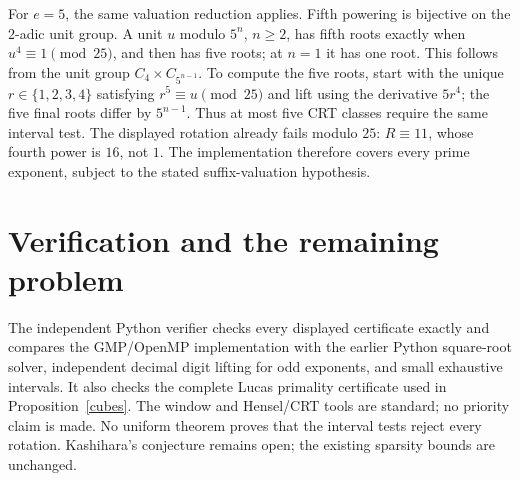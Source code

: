 \documentclass[9pt]{extarticle}
\begin{document}
For $e=5$, the same valuation reduction applies. Fifth powering is
bijective on the $2$-adic unit group. A unit $u$ modulo $5^n$, $n\ge2$,
has fifth roots exactly when $u^4\equiv1\pmod{25}$, and then has five
roots; at $n=1$ it has one root. This follows from the unit group
$C_4\times C_{5^{n-1}}$. To compute the five roots, start with the
unique $r\in\{1,2,3,4\}$ satisfying $r^5\equiv u\pmod{25}$ and lift
using the derivative $5r^4$; the five final roots differ by $5^{n-1}$.
Thus at most five CRT classes require the same interval test.
The displayed rotation already fails modulo $25$: $R\equiv11$, whose
fourth power is $16$, not $1$. The implementation therefore covers
every prime exponent, subject to the stated suffix-valuation hypothesis.

\section{Verification and the remaining problem}
The independent Python verifier checks every displayed certificate
exactly and compares the GMP/OpenMP implementation with
the earlier Python square-root solver, independent decimal digit lifting
for odd exponents, and small exhaustive intervals. It also checks the
complete Lucas primality certificate used in Proposition~\ref{cubes}.
The window and Hensel/CRT tools are standard; no priority claim is made.
No uniform theorem proves that the interval tests reject every rotation.
Kashihara's conjecture remains open; the existing sparsity bounds are unchanged.
\end{document}
